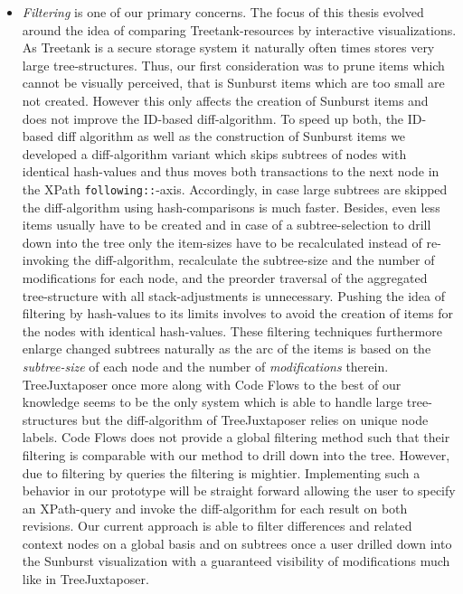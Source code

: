 \begin{itemize}
\item \emph{Filtering} is one of our primary concerns. The focus of this thesis evolved around the idea of comparing Treetank-resources by interactive visualizations. As Treetank is a secure storage system it naturally often times stores very large tree-structures. Thus, our first consideration was to prune items which cannot be visually perceived, that is Sunburst items which are too small are not created. However this only affects the creation of Sunburst items and does not improve the ID-based diff-algorithm. To speed up both, the ID-based diff algorithm as well as the construction of Sunburst items we developed a diff-algorithm variant which skips subtrees of nodes with identical hash-values and thus moves both transactions to the next node in the XPath \texttt{following::}-axis. Accordingly, in case large subtrees are skipped the diff-algorithm using hash-comparisons is much faster. Besides, even less items usually have to be created and in case of a subtree-selection to drill down into the tree only the item-sizes have to be recalculated instead of re-invoking the diff-algorithm, recalculate the subtree-size and the number of modifications for each node, and the preorder traversal of the aggregated tree-structure with all stack-adjustments is unnecessary. Pushing the idea of filtering by hash-values to its limits involves to avoid the creation of items for the nodes with identical hash-values. These filtering techniques furthermore enlarge changed subtrees naturally as the arc of the items is based on the \emph{subtree-size} of each node and the number of \emph{modifications} therein. TreeJuxtaposer once more along with Code Flows to the best of our knowledge seems to be the only system which is able to handle large tree-structures but the diff-algorithm of TreeJuxtaposer relies on unique node labels. Code Flows does not provide a global filtering method such that their filtering is comparable with our method to drill down into the tree. However, due to filtering by queries the filtering is mightier. Implementing such a behavior in our prototype will be straight forward allowing the user to specify an XPath-query and invoke the diff-algorithm for each result on both revisions. Our current approach is able to filter differences and related context nodes on a global basis and on subtrees once a user drilled down into the Sunburst visualization with a guaranteed visibility of modifications much like in TreeJuxtaposer.
\end{itemize}

